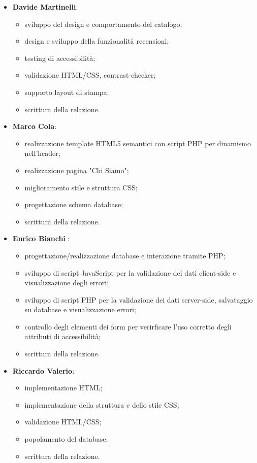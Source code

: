 \documentclass{article}
\begin{document}
\begin{itemize}
    \item \textbf{Davide Martinelli}:
            \begin{itemize}
                \item sviluppo del design e comportamento del catalogo;
                \item design e sviluppo della funzionalità recensioni;
                \item testing di accessibilità;
                \item validazione HTML/CSS, contrast-checker;
                \item supporto layout di stampa;
                \item scrittura della relazione.
            \end{itemize}
    \item \textbf{Marco Cola}:
        \begin{itemize}
            \item realizzazione template HTML5 semantici con script PHP per dinamismo nell'header;
            \item realizzazione pagina "Chi Siamo";
            \item miglioramento stile e struttura CSS;
            \item progettazione schema database;
            \item scrittura della relazione.
        \end{itemize}
    \item \textbf{Enrico Bianchi} :
            \begin{itemize}
                \item progettazione/realizzazione database e interazione tramite PHP;
                \item sviluppo di script JavaScript per la validazione dei dati client-side e visualizzazione degli errori;
                \item sviluppo di script PHP per la validazione dei dati server-side, salvataggio su database e visualizzazione errori;
                \item controllo degli elementi dei form per verirficare l’uso corretto degli attributi di accessibilità;
                \item scrittura della relazione.
            \end{itemize}
   \item \textbf{Riccardo Valerio}:
            \begin{itemize}
                \item implementazione HTML;
                \item implementazione della struttura e dello stile CSS;
                \item validazione HTML/CSS;
                \item popolamento del database;
                \item scrittura della relazione.
            \end{itemize}
\end{itemize}
\end{document}
